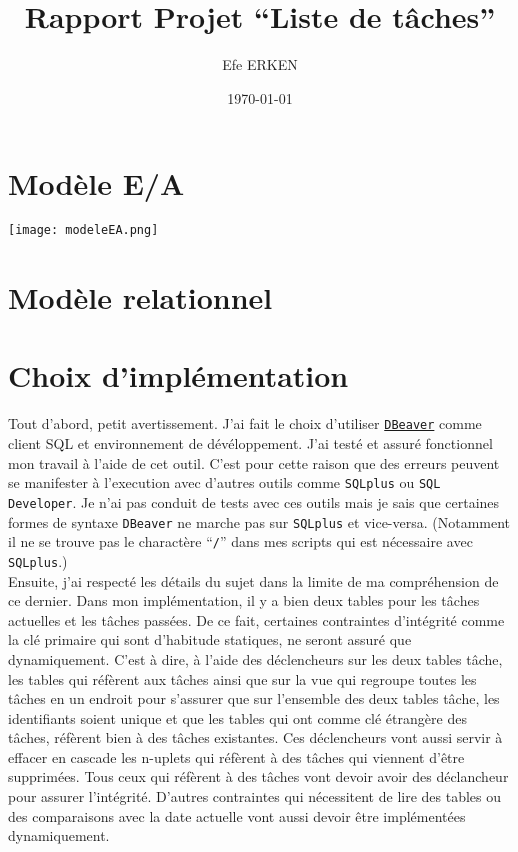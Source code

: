 \documentclass[12pt]{article}
\author{Efe ERKEN}
\date{\today}
\title{Rapport Projet ``Liste de tâches''}
\begin{document}
\maketitle

\section{Modèle E/A}
\begin{center}
	\texttt{[image: modeleEA.png]}
\end{center}

\section{Modèle relationnel}


\section{Choix d'implémentation}
Tout d'abord, petit avertissement. J'ai fait le choix d'utiliser
\href{https://dbeaver.io/}{\texttt{DBeaver}} comme client SQL et environnement
de dévéloppement. J'ai testé et assuré fonctionnel mon travail à l'aide de cet
outil. C'est pour cette raison que des erreurs peuvent se manifester à
l'execution avec d'autres outils comme \texttt{SQLplus} ou \texttt{SQL
	Developer}. Je n'ai pas conduit de tests avec ces outils mais je sais que
certaines formes de syntaxe \texttt{DBeaver} ne marche pas sur \texttt{SQLplus}
et vice-versa. (Notamment il ne se trouve pas le charactère ``\texttt{/}'' dans
mes scripts qui est nécessaire avec \texttt{SQLplus}.) \\

Ensuite, j'ai respecté les détails du sujet dans la limite de ma compréhension
de ce dernier. Dans mon implémentation, il y a bien deux tables pour les tâches
actuelles et les tâches passées. De ce fait, certaines contraintes d'intégrité
comme la clé primaire qui sont d'habitude statiques, ne seront assuré que
dynamiquement. C'est à dire, à l'aide des déclencheurs sur les deux tables
tâche, les tables qui réfèrent aux tâches ainsi que sur la vue qui regroupe
toutes les tâches en un endroit pour s'assurer que sur l'ensemble des deux
tables tâche, les identifiants soient unique et que les tables qui ont comme
clé étrangère des tâches, réfèrent bien à des tâches existantes. Ces
déclencheurs vont aussi servir à effacer en cascade les n-uplets qui réfèrent à
des tâches qui viennent d'être supprimées. Tous ceux qui réfèrent à des tâches
vont devoir avoir des déclancheur pour assurer l'intégrité. D'autres
contraintes qui nécessitent de lire des tables ou des comparaisons avec la date
actuelle vont aussi devoir être implémentées dynamiquement. \\
\end{document}
